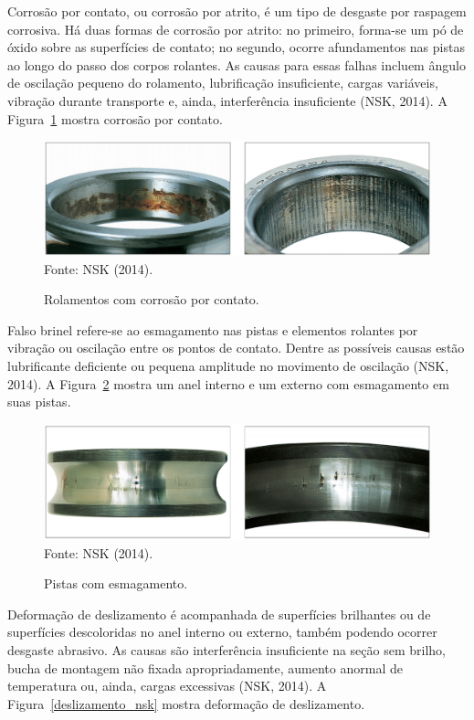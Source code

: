 \documentclass[
	12pt,				
	oneside,			
	a4paper,			
	english,			
	brazil,			
	]{abntex2ppgsi}
\begin{document}
Corrosão por contato, ou corrosão por atrito, é um tipo de desgaste por raspagem corrosiva. Há duas formas de corrosão por atrito: no primeiro, forma-se um pó de óxido sobre as superfícies de contato; no segundo, ocorre afundamentos nas pistas ao longo do passo dos corpos rolantes. As causas para essas falhas incluem ângulo de oscilação pequeno do rolamento, lubrificação insuficiente, cargas variáveis, vibração durante transporte e, ainda, interferência insuficiente (NSK, 2014). A Figura~\ref{corrosao_nsk} mostra corrosão por contato.

\begin{figure}[H]
\centering
\caption {Rolamentos com corrosão por contato.}
\includegraphics[width=\textwidth,height=\textheight,keepaspectratio]{corrosao_nsk} \\
Fonte: NSK (2014).
\label{corrosao_nsk}
\end{figure}

Falso brinel refere-se ao esmagamento nas pistas e elementos rolantes por vibração ou oscilação entre os pontos de contato. Dentre as possíveis causas estão lubrificante deficiente ou pequena amplitude no movimento de oscilação (NSK, 2014). A Figura~\ref{esmagamento_nsk} mostra um anel interno e um externo com esmagamento em suas pistas.

\begin{figure}[H]
\centering
\caption {Pistas com esmagamento.}
\includegraphics[width=\textwidth,height=\textheight,keepaspectratio]{esmagamento_nsk} \\
Fonte: NSK (2014).
\label{esmagamento_nsk}
\end{figure}

Deformação de deslizamento é acompanhada de superfícies brilhantes ou de superfícies descoloridas no anel interno ou externo, também podendo ocorrer desgaste abrasivo. As causas são interferência insuficiente na seção sem brilho, bucha de montagem não fixada apropriadamente, aumento anormal de temperatura ou, ainda, cargas excessivas (NSK, 2014). A Figura~\ref{deslizamento_nsk} mostra deformação de deslizamento.
\end{document}
